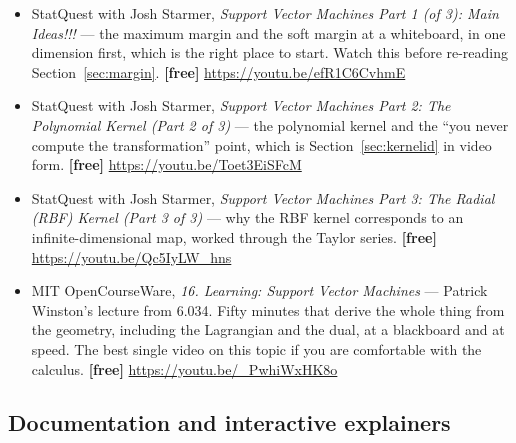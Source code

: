 \documentclass[11pt]{article}
\begin{document}
\begin{itemize}[leftmargin=*]
  \item StatQuest with Josh Starmer, \emph{Support Vector Machines Part 1
    (of 3): Main Ideas!!!} --- the maximum margin and the soft margin at a
    whiteboard, in one dimension first, which is the right place to start.
    Watch this before re-reading Section~\ref{sec:margin}. \textbf{[free]}
    \url{https://youtu.be/efR1C6CvhmE}
  \item StatQuest with Josh Starmer, \emph{Support Vector Machines Part 2: The
    Polynomial Kernel (Part 2 of 3)} --- the polynomial kernel and the
    ``you never compute the transformation'' point, which is
    Section~\ref{sec:kernelid} in video form. \textbf{[free]}
    \url{https://youtu.be/Toet3EiSFcM}
  \item StatQuest with Josh Starmer, \emph{Support Vector Machines Part 3: The
    Radial (RBF) Kernel (Part 3 of 3)} --- why the RBF kernel corresponds to an
    infinite-dimensional map, worked through the Taylor series.
    \textbf{[free]} \url{https://youtu.be/Qc5IyLW_hns}
  \item MIT OpenCourseWare, \emph{16. Learning: Support Vector Machines} ---
    Patrick Winston's lecture from 6.034. Fifty minutes that derive the whole
    thing from the geometry, including the Lagrangian and the dual, at a
    blackboard and at speed. The best single video on this topic if you are
    comfortable with the calculus. \textbf{[free]}
    \url{https://youtu.be/_PwhiWxHK8o}
\end{itemize}

\subsection*{Documentation and interactive explainers}
\end{document}
